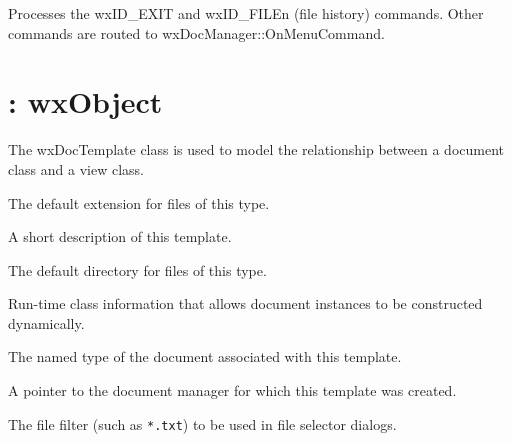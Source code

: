 

Processes the wxID\_EXIT and wxID\_FILEn (file history) commands.
Other commands are routed to wxDocManager::OnMenuCommand.


\section{: wxObject}\label{wxdoctemplate}


The wxDocTemplate class is used to model the relationship between a
document class and a view class.



The default extension for files of this type.



A short description of this template.



The default directory for files of this type.



Run-time class information that allows document instances to be constructed dynamically.



The named type of the document associated with this template.



A pointer to the document manager for which this template was created.



The file filter (such as \verb$*.txt$) to be used in file selector dialogs.

